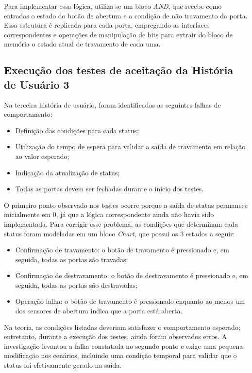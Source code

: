 Para implementar essa lógica, utiliza-se um bloco \textit{AND}, que recebe como entradas o estado do botão de abertura e a condição de não travamento da porta. Essa 
estrutura é replicada para cada porta, empregando as interfaces correspondentes e operações de manipulação de bits para extrair do bloco de memória o estado atual 
de travamento de cada uma.


\subsection{Execução dos testes de aceitação da História de Usuário 3}

Na terceira história de usuário, foram identificadas as seguintes falhas de comportamento:

\begin{itemize}
	\item Definição das condições para cada status;
	\item Utilização do tempo de espera para validar a saída de travamento em relação ao valor esperado;
	\item Indicação da atualização de status;
	\item Todas as portas devem ser fechadas durante o início dos testes.
\end{itemize}

O primeiro ponto observado nos testes ocorre porque a saída de status permanece inicialmente em 0, já que a lógica correspondente ainda não havia sido implementada. 
Para corrigir esse problema, as condições que determinam cada status foram modeladas em um bloco \textit{Chart}, que possui os 3 estados a seguir:

\begin{itemize}
	\item Confirmação de travamento: o botão de travamento é pressionado e, em seguida, todas as portas são travadas;
	\item Confirmação de destravamento: o botão de destravamento é pressionado e, em seguida, todas as portas são destravadas;
	\item Operação falha: o botão de travamento é pressionado enquanto ao menos um dos sensores de abertura indica que a porta está aberta.
\end{itemize}

Na teoria, as condições listadas deveriam satisfazer o comportamento esperado; entretanto, durante a execução dos testes, ainda foram observados erros. A investigação 
levantou a falha constatada no segundo ponto e exige uma pequena modificação nos cenários, incluindo uma condição temporal para validar que o status foi efetivamente 
gerado na saída.

